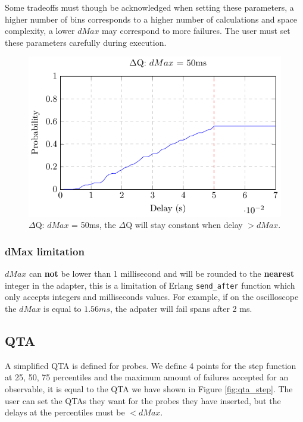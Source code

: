 Some tradeoffs must though be acknowledged when setting these parameters, a higher number of bins corresponds to a higher number of calculations and space complexity, a lower $dMax$ may correspond to more failures. The user must set these parameters carefully during execution.

    \begin{figure}[H]
        \begin{center}
            \includegraphics[scale = 1]{tikz/cdf_dmax.pdf}
        \end{center}
        \caption{$\Delta$Q: $dMax$ = 50ms, the $\Delta$Q will stay constant when delay $> dMax$.}
    \end{figure}

    \subsubsection{dMax limitation}
        $dMax$ can \textbf{not} be lower than 1 millisecond and will be rounded to the \textbf{nearest} integer in the adapter, this is a limitation of Erlang \texttt{send\_after} function which only accepts integers and milliseconds values. For example, if on the oscilloscope the $dMax$ is equal to $1.56 ms$, the adpater will fail spans after 2 ms.

    \subsection{QTA}
        A simplified QTA is defined for probes. We define 4 points for the step function at 25, 50, 75 percentiles and the maximum amount of failures accepted for an observable, it is equal to the QTA we have shown in Figure \cref{fig:qta_step}. The user can set the QTAs they want for the probes they have inserted, but the delays at the percentiles must be $< dMax$.


